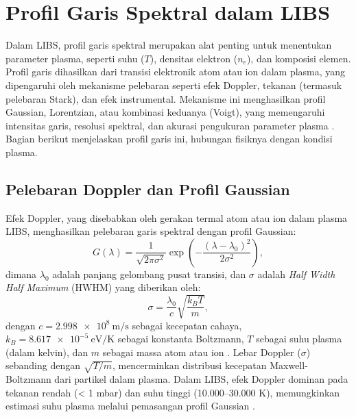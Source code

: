 \section{Profil Garis Spektral dalam LIBS}

Dalam LIBS, profil garis spektral merupakan alat penting untuk menentukan parameter plasma, seperti suhu (\( T \)), densitas elektron (\( n_e \)), dan komposisi elemen. Profil garis dihasilkan dari transisi elektronik atom atau ion dalam plasma, yang dipengaruhi oleh mekanisme pelebaran seperti efek Doppler, tekanan (termasuk pelebaran Stark), dan efek instrumental. Mekanisme ini menghasilkan profil Gaussian, Lorentzian, atau kombinasi keduanya (Voigt), yang memengaruhi intensitas garis, resolusi spektral, dan akurasi pengukuran parameter plasma \citep{Demtroder2010,Griem1997}. Bagian berikut menjelaskan profil garis ini, hubungan fisiknya dengan kondisi plasma.

\subsection{Pelebaran Doppler dan Profil Gaussian}
Efek Doppler, yang disebabkan oleh gerakan termal atom atau ion dalam plasma LIBS, menghasilkan pelebaran garis spektral dengan profil Gaussian:
\begin{equation}
G(\lambda) = \frac{1}{\sqrt{2\pi \sigma^2}} \exp\left(-\frac{(\lambda - \lambda_0)^2}{2\sigma^2}\right), \label{eq:gaussian}
\end{equation}
dimana \( \lambda_0 \) adalah panjang gelombang pusat transisi, dan \( \sigma \) adalah \textit{Half Width Half Maximum} (HWHM) yang diberikan oleh:
\begin{equation}
\sigma = \frac{\lambda_0}{c} \sqrt{\frac{k_B T}{m}}, \label{eq:sigma_doppler}
\end{equation}
dengan \( c = \SI{2.998e8}{\meter\per\second} \) sebagai kecepatan cahaya, \( k_B = \SI{8.617e-5}{\electronvolt\per\kelvin} \) sebagai konstanta Boltzmann, \( T \) sebagai suhu plasma (dalam kelvin), dan \( m \) sebagai massa atom atau ion \citep{Demtroder2010}. Lebar Doppler (\( \sigma \)) sebanding dengan \( \sqrt{T/m} \), mencerminkan distribusi kecepatan Maxwell-Boltzmann dari partikel dalam plasma. Dalam LIBS, efek Doppler dominan pada tekanan rendah (< 1 mbar) dan suhu tinggi (10.000–30.000 K), memungkinkan estimasi suhu plasma melalui pemasangan profil Gaussian \citep{Miziolek2006}.

